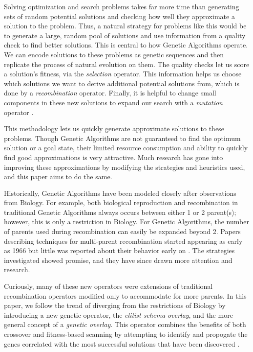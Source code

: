 Solving optimization and search problems takes far more time than generating sets of random potential solutions and checking how well they approximate a solution to the problem. Thus, a natural strategy for problems like this would be to generate a large, random pool of solutions and use information from a quality check to find better solutions. This is central to how Genetic Algorithms operate. We can encode solutions to these problems as genetic sequences and then replicate the process of natural evolution on them. The quality checks let us score a solution's fitness, via the \emph{selection} operator. This information helps us choose which solutions we want to derive additional potential solutions from, which is done by a \emph{recombination} operator. Finally, it is helpful to change small components in these new solutions to expand our search with a \emph{mutation} operator \cite{Deb99}.

This methodology lets us quickly generate approximate solutions to these problems. Though Genetic Algorithms are not guaranteed to find the optimum solution or a goal state, their limited resource consumption and ability to quickly find good approximations is very attractive\cite{Russell10}. Much research has gone into improving these approximations by modifying the strategies and heuristics used, and this paper aims to do the same.

Historically, Genetic Algorithms have been modeled closely after observations from Biology. For example, both biological reproduction and recombination in traditional Genetic Algorithms always occurs between either 1 or 2 parent(s); however, this is only a restriction in Biology\cite{Eiben95}. For Genetic Algorithms, the number of parents used during recombination can easily be expanded beyond 2. Papers describing techniques for multi-parent recombination started appearing as early as 1966 but little was reported about their behavior early on \cite{Eiben03}. The strategies investigated showed promise, and they have since drawn more attention and research\cite{Eiben94}. 

Curiously, many of these new operators were extensions of traditional recombination operators modified only to accommodate for more parents. In this paper, we follow the trend of diverging from the restrictions of Biology by introducing a new genetic operator, the \emph{elitist schema overlay}, and the more general concept of a \emph{genetic overlay}. This operator combines the benefits of both crossover and fitness-based scanning by attempting to identify and propogate the genes correlated with the most successful solutions that have been discovered \cite{Russell10}. 